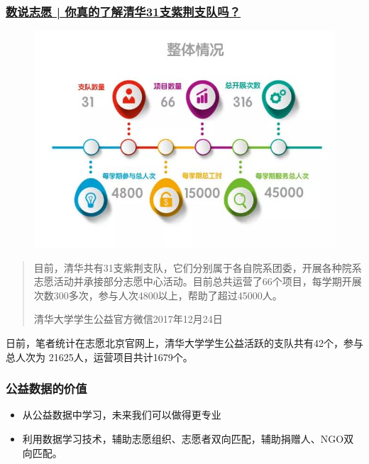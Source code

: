 \documentclass{ctexbeamer}
\begin{document}
\begin{frame}
\frametitle{\href{http://mp.weixin.qq.com/s/2XXehZ4KlFKT7FuEqluY3w}{数说志愿 | 你真的了解清华31支紫荆支队吗？ }}
\begin{figure}
\includegraphics[width=\textwidth]{background3.jpg}
\end{figure}
\end{frame}
\begin{frame}
\begin{quote}
目前，清华共有31支紫荆支队，它们分别属于各自院系团委，开展各种院系志愿活动并承接部分志愿中心活动。目前总共运营了66个项目，每学期开展次数300多次，参与人次4800以上，帮助了超过45000人。
\begin{flushright}
清华大学学生公益官方微信2017年12月24日
\end{flushright}
\end{quote}
日前，笔者统计在志愿北京官网上，清华大学学生公益活跃的支队共有42个，参与总人次为 21625人，运营项目共计1679个。
\end{frame}

\begin{frame}
\frametitle{公益数据的价值}%
\begin{itemize}
\item 从公益数据中学习，未来我们可以做得更专业 %
\item 利用数据学习技术，辅助志愿组织、志愿者双向匹配，辅助捐赠人、NGO双向匹配。
\end{itemize}
\end{frame}
\end{document}

